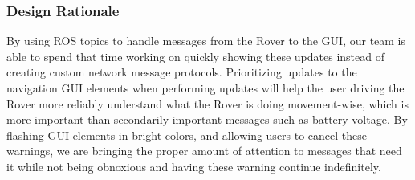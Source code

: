 \subsubsection{Design Rationale}
By using ROS topics to handle messages from the Rover to the GUI, our team is able to spend that time working on quickly showing these updates instead of creating custom network message protocols.
Prioritizing updates to the navigation GUI elements when performing updates will help the user driving the Rover more reliably understand what the Rover is doing movement-wise, which is more important than secondarily important messages such as battery voltage.
By flashing GUI elements in bright colors, and allowing users to cancel these warnings, we are bringing the proper amount of attention to messages that need it while not being obnoxious and having these warning continue indefinitely.
